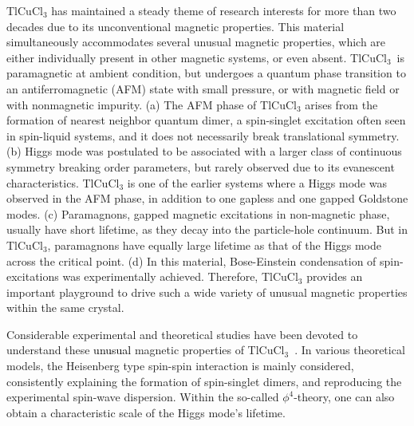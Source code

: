 \documentclass[aps,prl,showpacs,twocolumn,groupedaddress]{revtex4-1}
\newcommand{\TCC}{TlCuCl$_3$~}
\newcommand{\blue}{\textcolor{black}}
\begin{document}
\pacs{}

\maketitle
TlCuCl$_3$ has maintained a steady theme of research interests for more than two decades due to its unconventional magnetic properties. This material simultaneously accommodates several unusual magnetic properties, which are either individually present in other magnetic systems, or even absent. \TCC  is paramagnetic at ambient condition, but undergoes a quantum phase transition to an antiferromagnetic (AFM) state with small pressure\cite{pressure4,pressure3,pressure1,pressure2}, or with magnetic field\cite{mag4,mag3,bec2,mag2} or with nonmagnetic impurity\cite{impurity}. (a) The AFM phase of TlCuCl$_3$ arises from the formation of nearest neighbor quantum dimer, a spin-singlet excitation often seen in spin-liquid systems, and it does not necessarily break translational symmetry.\cite{th21,bec1,th1,pressure1,mag1} (b) Higgs mode was postulated to be associated with a larger class of continuous symmetry breaking order parameters\cite{th21,Higgs}, but rarely observed due to its evanescent characteristics.\cite{Higgsvisibility1,Higgsvisibility2,Higgsvisibility3} TlCuCl$_3$ is one of the earlier systems where a Higgs mode was observed in the AFM phase, in addition to one gapless and one gapped Goldstone modes.\cite{pressure1,pressure2,pm1} (c) Paramagnons, gapped magnetic excitations in non-magnetic phase, usually have short lifetime, as they decay into the particle-hole continuum. But in TlCuCl$_3$, paramagnons have equally large lifetime as that of the Higgs mode across the critical point.\cite{pressure2,pm1} (d) In this material, Bose-Einstein condensation of spin-excitations was experimentally achieved.\cite{bec1,bec2,mag1,th1} Therefore, TlCuCl$_3$ provides an important playground to drive such a wide variety of unusual magnetic properties within the same crystal. 

Considerable experimental and theoretical studies have been devoted to understand these \blue{unusual} magnetic properties of \TCC \cite{bec1,bec2,pm1,pressure1,pressure2,mag1,mag2,th1,th2,th21,th3,th4,Sushkov,QMC}. In various theoretical models, the Heisenberg type spin-spin interaction is mainly considered\cite{th1,th2}, consistently explaining the formation of spin-singlet dimers, and reproducing the experimental spin-wave dispersion\cite{pressure1,pressure2,mag1}. Within the so-called $\phi^4$-theory, one can also obtain a characteristic scale of the Higgs mode's lifetime\cite{th1,th2,th21,Higgslifetime,Higgsvisibility3}. 
\end{document}
